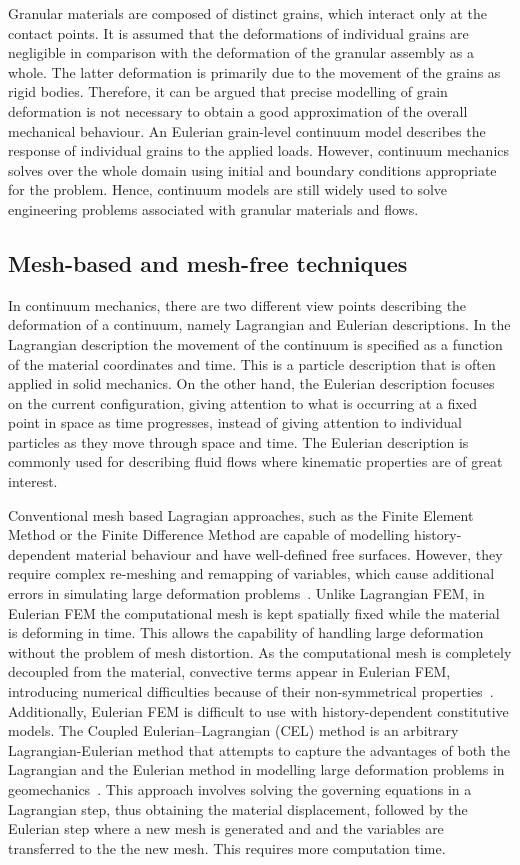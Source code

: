 Granular materials are composed of distinct grains, which interact only at 
the contact points. It is assumed that the deformations of individual grains 
are negligible in comparison with the deformation of the granular assembly as 
a whole. The latter deformation is primarily due to the movement of the grains 
as rigid bodies. Therefore, it can be argued that precise modelling of grain 
deformation is not necessary to obtain a good approximation of the overall 
mechanical behaviour. An Eulerian grain-level continuum model describes the 
response of individual grains to the applied loads. However, continuum 
mechanics solves over the whole domain using initial and boundary conditions 
appropriate for the problem. Hence, continuum models are still widely used to 
solve engineering problems associated with granular materials and flows.

\subsection{Mesh-based and mesh-free techniques}

In continuum mechanics, there are two different view points describing the 
deformation of a continuum, namely Lagrangian and Eulerian 
descriptions. In the Lagrangian description  the movement of the continuum is 
specified as a function of the material coordinates and time. This is a 
particle description that is often applied in solid mechanics. On the other 
hand, the Eulerian description focuses on the current configuration, giving 
attention to what is occurring at a fixed point in space as time progresses, 
instead of giving attention to individual particles as they move through space 
and time. The Eulerian description is commonly used for describing fluid flows 
where kinematic properties are of great interest. 

Conventional mesh based Lagragian approaches, such as the Finite Element Method 
or the Finite Difference Method are capable of modelling history-dependent 
material behaviour and have well-defined free surfaces. However, they require 
complex re-meshing and remapping of variables, which cause additional errors in 
simulating large deformation problems~\citep{Li2002}. Unlike Lagrangian FEM, 
in Eulerian FEM the computational mesh is kept spatially fixed while the 
material is deforming in time. This allows the capability of handling large 
deformation without the problem of mesh distortion. As the computational mesh 
is completely decoupled from the material, convective terms appear in Eulerian 
FEM, introducing numerical difficulties because of their non-symmetrical 
properties~\citep{Donea1982}. Additionally, Eulerian FEM is difficult to use
with history-dependent constitutive models. The Coupled Eulerian–Lagrangian 
(CEL) method is an arbitrary Lagrangian-Eulerian method that attempts to 
capture the advantages of both the Lagrangian and the Eulerian method in 
modelling large deformation problems in geomechanics~\citep{Qiu2011}. This 
approach involves solving the governing equations in a Lagrangian step, thus 
obtaining the material displacement, followed by the Eulerian step where a 
new mesh is generated and and the variables are transferred to the the new 
mesh. This requires more computation time. 

